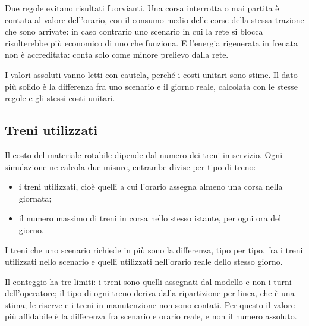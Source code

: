 Due regole evitano risultati fuorvianti. Una corsa interrotta o mai partita è contata al valore dell'orario, con il consumo medio delle corse della stessa trazione che sono arrivate: in caso contrario uno scenario in cui la rete si blocca risulterebbe più economico di uno che funziona. E l'energia rigenerata in frenata non è accreditata: conta solo come minore prelievo dalla rete.

I valori assoluti vanno letti con cautela, perché i costi unitari sono stime. Il dato più solido è la differenza fra uno scenario e il giorno reale, calcolata con le stesse regole e gli stessi costi unitari.

\subsection{Treni utilizzati}
Il costo del materiale rotabile dipende dal numero dei treni in servizio. Ogni simulazione ne calcola due misure, entrambe divise per tipo di treno:
\begin{itemize}
	\item i treni utilizzati, cioè quelli a cui l'orario assegna almeno una corsa nella giornata;
	\item il numero massimo di treni in corsa nello stesso istante, per ogni ora del giorno.
\end{itemize}
I treni che uno scenario richiede in più sono la differenza, tipo per tipo, fra i treni utilizzati nello scenario e quelli utilizzati nell'orario reale dello stesso giorno.

Il conteggio ha tre limiti: i treni sono quelli assegnati dal modello e non i turni dell'operatore; il tipo di ogni treno deriva dalla ripartizione per linea, che è una stima; le riserve e i treni in manutenzione non sono contati. Per questo il valore più affidabile è la differenza fra scenario e orario reale, e non il numero assoluto.
